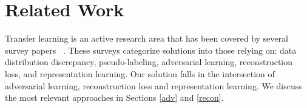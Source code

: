 \documentclass{article}
\newcommand{\remove}[1]{}
\begin{document}

\remove{Need a background section describing terminology and concepts like domain adaptation, GANs etc.}

\section{Related Work} \label{Related Work}
%
Transfer learning 
is an active research area that has been covered by several survey papers ~\cite{liu2022deep,zhang2022transfer,zhang2021survey,zhuang2020,liu2019transferable,wang2018deep}. These surveys categorize solutions into those relying on: data distribution discrepancy, pseudo-labeling, adversarial learning, reconstruction loss, and representation learning. Our solution falls in the intersection of adversarial learning, reconstruction loss and representation learning. We discuss the most relevant approaches in Sections \ref{adv} and  \ref{recon}. %
\end{document}
